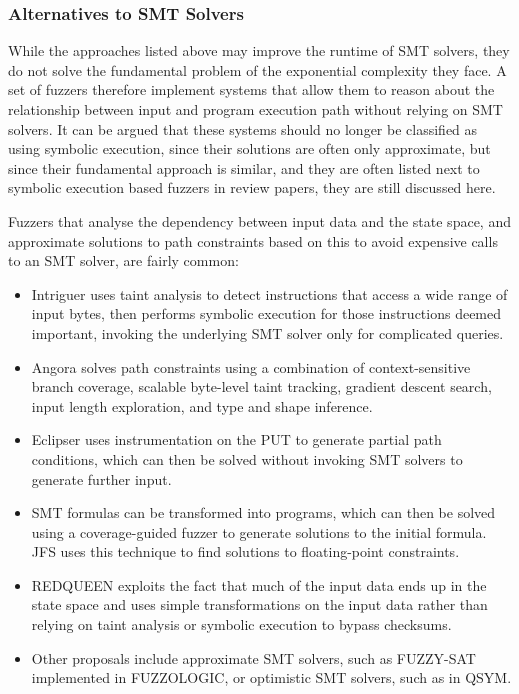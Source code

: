 \documentclass{article}
\begin{document}
\begin{multicols}{2}
    \subsubsection{Alternatives to SMT Solvers}
    While the approaches listed above may improve the runtime of SMT solvers, they do not solve the fundamental problem of the exponential complexity they face. A set of fuzzers therefore implement systems that allow them to reason about the relationship between input and program execution path without relying on SMT solvers. It can be argued that these systems should no longer be classified as using symbolic execution, since their solutions are often only approximate, but since their fundamental approach is similar, and they are often listed next to symbolic execution based fuzzers in review papers, they are still discussed here.

    Fuzzers that analyse the dependency between input data and the state space, and approximate solutions to path constraints based on this to avoid expensive calls to an SMT solver, are fairly common\cite{WEIZZ}:

    \begin{itemize}
        \item Intriguer\cite{Intriguer} uses taint analysis to detect instructions that access a wide range of input bytes, then performs symbolic execution for those instructions deemed important, invoking the underlying SMT solver only for complicated queries.
        \item Angora\cite{Angora} solves path constraints using a combination of context-sensitive branch coverage, scalable byte-level taint tracking, gradient descent search, input length exploration, and type and shape inference.
        \item Eclipser\cite{Eclipser} uses instrumentation on the PUT to generate partial path conditions, which can then be solved without invoking SMT solvers to generate further input.
        \item SMT formulas can be transformed into programs, which can then be solved using a coverage-guided fuzzer to generate solutions to the initial formula. JFS\cite{JFS} uses this technique to find solutions to floating-point constraints.
        \item REDQUEEN\cite{REDQUEEN} exploits the fact that much of the input data ends up in the state space and uses simple transformations on the input data rather than relying on taint analysis or symbolic execution to bypass checksums.
        \item Other proposals include approximate SMT solvers, such as FUZZY-SAT implemented in FUZZOLOGIC\cite{FUZZOLIC}, or optimistic SMT solvers, such as in QSYM\cite{QSYM}.
    \end{itemize}


\end{multicols}
\end{document}
